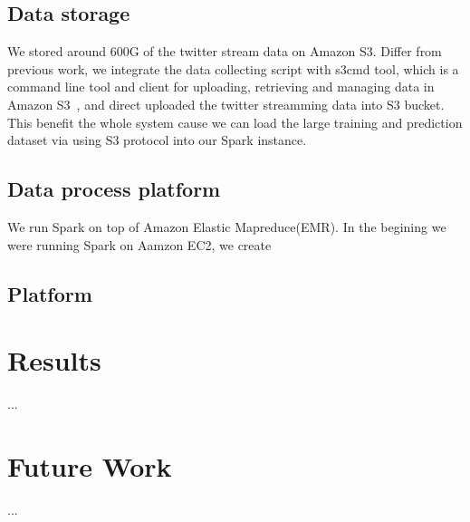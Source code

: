 \documentclass{llncs}
\begin{document}
\subsection{Data storage}
We stored around 600G of the twitter stream data on Amazon S3. Differ from previous work, we integrate the data collecting script with s3cmd tool, which is a command line tool and client for uploading, retrieving and managing data in Amazon S3~\cite{s3cmd}, and direct uploaded the twitter streamming data into S3 bucket. This benefit the whole system cause we can load the large training and prediction dataset via using S3 protocol into our Spark instance. 

\subsection{Data process platform}
We run Spark on top of Amazon Elastic Mapreduce(EMR). In the begining we were running Spark on Aamzon EC2, we create 


\subsection{Platform}

\section{Results}
...


\section{Future Work}
...






\end{document}
